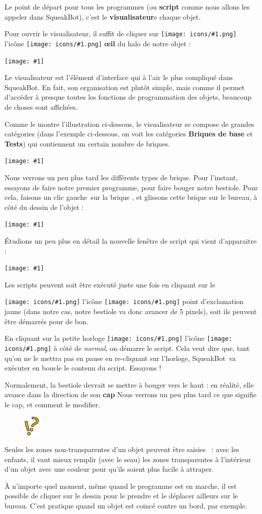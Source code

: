 \documentclass[a4paper,12pt]{book}
\def\appName{SqueakBot}
\def\cg{clic gauche~}
\newcommand{\capture}[1]
{
\begin{center}
	\texttt{[image: \#1]}
\end{center}
}
\newcommand{\brique}[1]{
\sffamily
\fcolorbox[RGB]{200,192,144}{200,248,200}{\textbf{#1}}
\normalfont
}
\newcommand{\important}[1]{\textbf{#1}}
\newcommand{\motcle}[2]{\important{\gls{#1}}}
\newcommand{\inserticon}[1]
{
\texttt{[image: icons/\#1.png]}
}
\newcommand{\icon}[2][]
{
\ifthenelse {\equal{#1} {}} {\inserticon{#2}} {l'icône \inserticon{#2} \important{#1}}
}
\newcommand{\astuce}[1]
{
\begin{framed}
\begin{figure}
	\vspace{-15pt}
	\includegraphics[width=2.0em]{astuce.png}
\end{figure}
#1
\end{framed}
}
\let\myMargin\marginpar
\renewcommand{\marginpar}[1]{\myMargin{{\scriptsize \sffamily #1}}}
\begin{document}
Le point de départ pour tous les programmes (ou \motcle{script}, comme nous
allons les appeler dans \appName), c'est le \motcle{visualisateur} de chaque
objet.

Pour ouvrir le visualisateur, il suffit de cliquer sur \icon[\og \oe il
\fg]{oeil} du halo de notre objet :

\capture{8bis.png}

Le visualisateur est l'élément d'interface qui à l'air le plus compliqué dans
\appName. En fait, son organisation est plutôt simple, mais comme il permet
d'accéder à presque toutes les fonctions de programmation des objets, beaucoup
de choses sont affichées.

Comme le montre l'illustration ci-dessous, le visualisateur se compose de
grandes catégories (dans l'exemple ci-dessous, on voit les catégories
\important{Briques de base} et \important{Tests}) qui contiennent un certain
nombre de briques.

\capture{9.png}

Nous verrons un peu plus tard les différents types de brique. Pour l'instant,
essayons de faire notre premier programme, pour faire bouger notre bestiole.
Pour cela, faisons un \cg sur la brique \brique{avance de 5}, et glissons cette
brique sur le bureau, à côté du dessin de l'objet :

\capture{10bis.png}

Étudions un peu plus en détail la nouvelle fenêtre de script qui vient
d'apparaitre :

\capture{11bis.png}

Les scripts peuvent soit être exécuté juste une fois en cliquant sur le
\icon{exclamation} point d'exclamation jaune (dans notre cas, notre bestiole va
donc avancer de 5 pixels), soit ils peuvent être démarrés pour de bon.

En cliquant sur la petite horloge \icon{horlogestop} à côté de \textit{normal},
on démarre le script. Cela veut dire que, tant qu'on ne le mettra pas en pause
en re-cliquant sur l'horloge, \appName~va exécuter en boucle le contenu du
script. Essayons !

Normalement, la bestiole devrait se mettre à bouger vers le haut : en réalité,
elle avance dans la direction de son \motcle{cap}. Nous verrons un peu plus
tard ce que signifie le cap, et comment le modifier.

\astuce{Seules les zones non-transparentes d'un objet peuvent être \og saisies
\fg~: avec les enfants, il vaut mieux remplir (avec le seau) les zones
transparentes à l'intérieur d'un objet avec une couleur pour qu'ils soient plus
facile à attraper.} À n'importe quel moment, même quand le programme est en
marche, il est possible de cliquer sur le dessin pour le prendre et le déplacer
ailleurs sur le bureau. C'est pratique quand un objet est coincé contre un
bord, par exemple.
\end{document}
